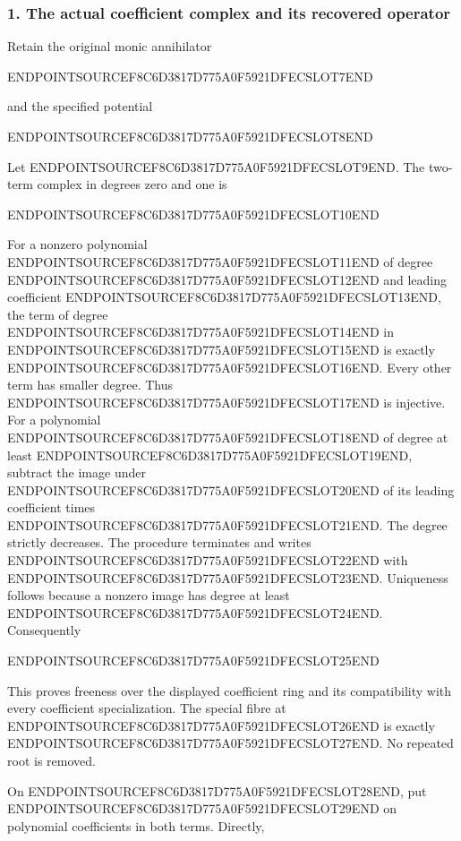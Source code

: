 \subsubsection{1. The actual coefficient complex and its recovered operator}\label{endpoint-purity_review--the-actual-coefficient-complex-and-its-recovered-operator}

Retain the original monic annihilator

ENDPOINTSOURCEF8C6D3817D775A0F5921DFECSLOT7END

and the specified potential

ENDPOINTSOURCEF8C6D3817D775A0F5921DFECSLOT8END

Let ENDPOINTSOURCEF8C6D3817D775A0F5921DFECSLOT9END. The two-term complex in degrees zero and one is

ENDPOINTSOURCEF8C6D3817D775A0F5921DFECSLOT10END

For a nonzero polynomial ENDPOINTSOURCEF8C6D3817D775A0F5921DFECSLOT11END of degree ENDPOINTSOURCEF8C6D3817D775A0F5921DFECSLOT12END and leading coefficient ENDPOINTSOURCEF8C6D3817D775A0F5921DFECSLOT13END, the term of degree ENDPOINTSOURCEF8C6D3817D775A0F5921DFECSLOT14END in ENDPOINTSOURCEF8C6D3817D775A0F5921DFECSLOT15END is exactly ENDPOINTSOURCEF8C6D3817D775A0F5921DFECSLOT16END. Every other term has smaller degree. Thus ENDPOINTSOURCEF8C6D3817D775A0F5921DFECSLOT17END is injective. For a polynomial ENDPOINTSOURCEF8C6D3817D775A0F5921DFECSLOT18END of degree at least ENDPOINTSOURCEF8C6D3817D775A0F5921DFECSLOT19END, subtract the image under ENDPOINTSOURCEF8C6D3817D775A0F5921DFECSLOT20END of its leading coefficient times ENDPOINTSOURCEF8C6D3817D775A0F5921DFECSLOT21END. The degree strictly decreases. The procedure terminates and writes ENDPOINTSOURCEF8C6D3817D775A0F5921DFECSLOT22END with ENDPOINTSOURCEF8C6D3817D775A0F5921DFECSLOT23END. Uniqueness follows because a nonzero image has degree at least ENDPOINTSOURCEF8C6D3817D775A0F5921DFECSLOT24END. Consequently

ENDPOINTSOURCEF8C6D3817D775A0F5921DFECSLOT25END

This proves freeness over the displayed coefficient ring and its compatibility with every coefficient specialization. The special fibre at ENDPOINTSOURCEF8C6D3817D775A0F5921DFECSLOT26END is exactly ENDPOINTSOURCEF8C6D3817D775A0F5921DFECSLOT27END. No repeated root is removed.

On ENDPOINTSOURCEF8C6D3817D775A0F5921DFECSLOT28END, put ENDPOINTSOURCEF8C6D3817D775A0F5921DFECSLOT29END on polynomial coefficients in both terms. Directly,

